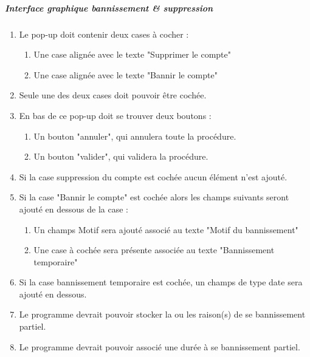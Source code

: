 \documentclass[10pt,a4paper]{report}
\begin{document}
\subparagraph{Interface graphique bannissement \& suppression}\label{del} 
	\begin{enumerate}

		\item Le pop-up doit contenir deux cases à cocher :
			\begin{enumerate}[label=\arabic*.]
				\item Une case alignée avec le texte "Supprimer le compte"
				\item Une case alignée avec le texte "Bannir le compte"
			\end{enumerate} 
		\item Seule une des deux cases doit pouvoir être cochée.
		\item En bas de ce pop-up doit se trouver deux boutons :
			\begin{enumerate}[label=\arabic*.]
				\item Un bouton "annuler", qui annulera toute la procédure.
				\item Un bouton "valider", qui validera la procédure.
			\end{enumerate} 
		\item Si la case suppression du compte est cochée aucun élément n'est ajouté.
		\item Si la case "Bannir le compte" est cochée alors les champs suivants seront ajouté en dessous de la case :
			\begin{enumerate}[label=\arabic*.]
				\item Un champs Motif sera ajouté associé au texte "Motif du bannissement"
				\item Une case à cochée sera présente associée au texte "Bannissement temporaire"
			\end{enumerate} 
		\item Si la case bannissement temporaire est cochée, un champs de type date sera ajouté en dessous. 
		\item Le programme devrait pouvoir stocker la ou les raison(s) de se bannissement partiel.
		\item Le programme devrait pouvoir associé une durée à se bannissement partiel.
	\end{enumerate}
	
\end{document}
